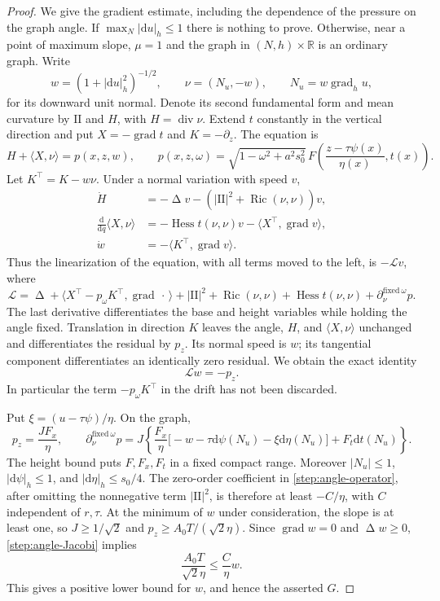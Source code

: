 \documentclass[11pt]{article}
\numberwithin{equation}{section}
\theoremstyle{definition}
\theoremstyle{remark}
\begin{document}
\begin{proof}
We give the gradient estimate, including the dependence of the pressure
on the graph angle.  If $\max_N|\mathrm d u|_h\le1$ there is nothing to prove.
Otherwise, near a point of maximum slope, $\mu=1$ and the graph in
$(N,h)\times\mathbb R$ is an ordinary graph.  Write
\[
 w=(1+|\mathrm d u|_h^2)^{-1/2},\qquad
 \nu=(N_u,-w),\qquad N_u=w\operatorname{grad}_hu,
\]
for its downward unit normal.  Denote its second fundamental form and
mean curvature by $\mathrm{II}$ and $H$, with $H=\operatorname{div}\nu$.  Extend
$t$ constantly in the vertical direction and put $X=-\operatorname{grad} t$ and
$K=-\partial_z$.  The equation is
\[
 H+\langle X,\nu\rangle=p(x,z,w),\qquad
 p(x,z,\omega)=\sqrt{1-\omega^2+a^2s_0^2}\,
 F\left(\frac{z-\tau\psi(x)}{\eta(x)},t(x)\right).
\]
Let $K^\top=K-w\nu$.  Under a normal variation with speed $v$,
\begin{align*}
 \dot H&=-\operatorname{\Delta} v-(|\mathrm{II}|^2+\operatorname{Ric}(\nu,\nu))v,\\
 \frac{\mathrm d}{\mathrm d q}\langle X,\nu\rangle
 &=-\operatorname{Hess} t(\nu,\nu)v-\langle X^\top,\operatorname{grad} v\rangle,\\
 \dot w&=-\langle K^\top,\operatorname{grad} v\rangle.
\end{align*}
Thus the linearization of the equation, with all terms moved to the
left, is $-\mathcal Lv$, where
\begin{equation}\label{step:angle-operator}
 \mathcal L=\operatorname{\Delta}+
 \langle X^\top-p_\omega K^\top,\operatorname{grad}\,\cdot\,\rangle
 +|\mathrm{II}|^2+\operatorname{Ric}(\nu,\nu)+\operatorname{Hess} t(\nu,\nu)
 +\partial_\nu^{\mathrm{fixed}\ \omega}p.
\end{equation}
The last derivative differentiates the base and height variables while
holding the angle fixed.  Translation in direction $K$ leaves the angle,
$H$, and $\langle X,\nu\rangle$ unchanged and differentiates the
residual by $p_z$.  Its normal speed is $w$; its tangential component
differentiates an identically zero residual.  We obtain the exact identity
\begin{equation}\label{step:angle-Jacobi}
 \mathcal Lw=-p_z.
\end{equation}
In particular the term $-p_\omega K^\top$ in the drift has not been
discarded.

Put $\xi=(u-\tau\psi)/\eta$.  On the graph,
\[
 p_z=\frac{JF_x}{\eta},\qquad
 \partial_\nu^{\mathrm{fixed}\ \omega}p
 =J\left\{
 \frac{F_x}{\eta}\bigl[-w-\tau\mathrm d\psi(N_u)-\xi\mathrm d\eta(N_u)\bigr]
 +F_t\mathrm d t(N_u)\right\}.
\]
The height bound puts $F,F_x,F_t$ in a fixed compact range.  Moreover
$|N_u|\le1$, $|\mathrm d\psi|_h\le1$, and $|\mathrm d\eta|_h\le s_0/4$.
The zero-order coefficient in \cref{step:angle-operator}, after omitting
the nonnegative term $|\mathrm{II}|^2$, is therefore at least $-C/\eta$,
with $C$ independent of $r,\tau$.  At the minimum of $w$ under
consideration, the slope is at least one, so $J\ge1/\sqrt2$ and
$p_z\ge A_0T/(\sqrt2\eta)$.  Since $\operatorname{grad} w=0$ and $\operatorname{\Delta} w\ge0$,
\cref{step:angle-Jacobi} implies
\[
 \frac{A_0T}{\sqrt2\eta}\le\frac C\eta w.
\]
This gives a positive lower bound for $w$, and hence the asserted $G$.


\end{proof}
\end{document}
